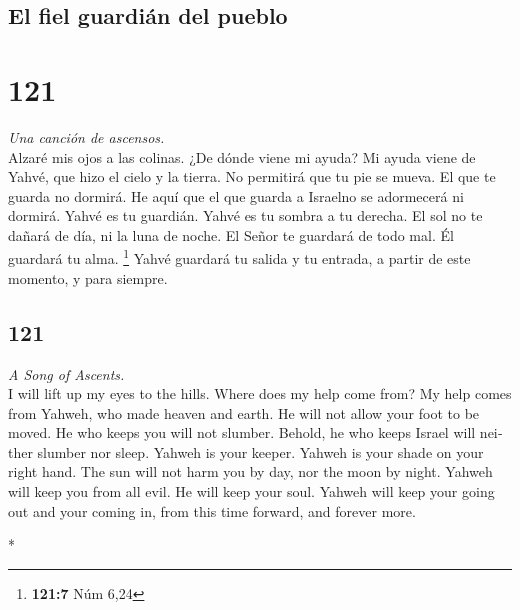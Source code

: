 \begin{paracol}{2}
{\subsection{El fiel guardián del
pueblo}\label{el-fiel-guardiuxe1n-del-pueblo}}

\hypertarget{section-240}{%
\section{121}\label{section-240}}

\emph{Una canción de ascensos.}\\
 Alzaré mis ojos a las colinas. ¿De dónde viene mi ayuda?
 Mi ayuda viene de Yahvé, que hizo el cielo y la tierra.
 No permitirá que tu pie se mueva. El que te guarda no
dormirá.  He aquí que el que guarda a Israelno se
adormecerá ni dormirá.  Yahvé es tu guardián. Yahvé es tu
sombra a tu derecha.  El sol no te dañará de día, ni la
luna de noche.  El Señor te guardará de todo mal. Él
guardará tu alma. \footnote{\textbf{121:7} Núm 6,24} 
Yahvé guardará tu salida y tu entrada, a partir de este momento, y para
siempre.

\switchcolumn
\begin{otherlanguage}{english}

\hypertarget{section-241}{%
\section{121}\label{section-241}}

\emph{A Song of Ascents.}\\
 I will lift up my eyes to the hills. Where does my help
come from?  My help comes from Yahweh, who made heaven and
earth.  He will not allow your foot to be moved. He who
keeps you will not slumber.  Behold, he who keeps Israel
will neither slumber nor sleep.  Yahweh is your keeper.
Yahweh is your shade on your right hand.  The sun will not
harm you by day, nor the moon by night.  Yahweh will keep
you from all evil. He will keep your soul.  Yahweh will
keep your going out and your coming in, from this time forward, and
forever more.

\end{otherlanguage}

\switchcolumn[0]*


\end{paracol}
